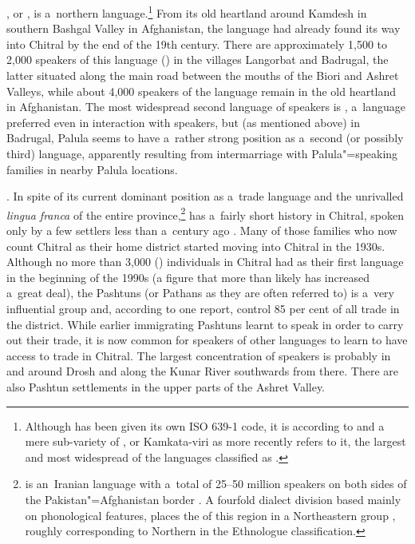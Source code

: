 \textbf{\iliShekhani [xvi]}, or \iliKamviri, is a~northern \iliNuristani language.\footnote{Although \iliKamviri has been given its own ISO 639-1 code, it is according to \citet[298]{strand1973} and \citet[104]{degener2002} a mere sub-variety of \iliKati [bsh], or Kamkata-viri as \citet{strand2001} more recently refers to it, the largest and most widespread of the languages classified as \iliNuristani.} From its old heartland around Kamdesh in southern Bashgal Valley in Afghanistan, the language had already found its way into Chitral by the end of the 19th century. There are approximately 1,500 to 2,000 speakers of this language (\citealt{decker1992a}) in the villages Langorbat and Badrugal, the latter situated along the main road between the mouths of the Biori and Ashret Valleys, while about 4,000 speakers of the language remain in the old heartland in Afghanistan. The most widespread second language of \iliShekhani speakers is \iliPashto, a~language preferred even in interaction with \iliKhowar speakers, but (as mentioned above) in Badrugal, Palula seems to have a~rather strong position as a~second (or possibly third) language, apparently resulting from intermarriage with Palula"=speaking families in nearby Palula locations.


\textbf{\iliPashto [pbu]}. In spite of its current dominant position as a~trade language and the unrivalled \textit{lingua franca} of the entire province,\footnote{\iliPashto is an~Iranian language with a~total of 25--50 million speakers on both sides of the Pakistan"=Afghanistan border \citep[7--8]{david2013}. A fourfold dialect division based mainly on phonological features, places the \iliPashto of this region in a Northeastern group \citep[739--740]{elfenbein1997}, roughly corresponding to Northern \iliPashto [pbu] in the Ethnologue \citep{ethnologue2015} classification.} \iliPashto has a~fairly short history in Chitral, spoken only by a few settlers less than a~century ago \citep[67]{morgenstierne1932}. Many of those families who now count Chitral as their home district started moving into Chitral in the 1930s. Although no more than 3,000 (\citealt{decker1992a}) individuals in Chitral had \iliPashto as their first language in the beginning of the 1990s (a figure that more than likely has increased a~great deal), the Pashtuns (or Pathans as they are often referred to) is a~very influential group and, according to one report, control 85 per cent of all trade in the district. While earlier immigrating Pashtuns learnt to speak \iliKhowar in order to carry out their trade, it is now common for speakers of other languages to learn \iliPashto to have access to trade in Chitral. The largest concentration of \iliPashto speakers is probably in and around Drosh and along the Kunar River southwards from there. There are also Pashtun settlements in the upper parts of the Ashret Valley. 



